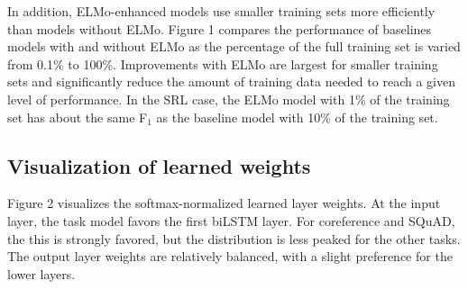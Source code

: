 \documentclass[11pt,a4paper]{article}
\newcommand{\ELMO}{ELMo}
\newcommand\mgcomment[1]{\textcolor{blue}{\textbf{[#1] --\textsc{MG}}}}
\begin{document}
In addition, \ELMO{}-enhanced models use smaller training sets more efficiently than models without \ELMO.
Figure 1 compares the performance of baselines models with and without \ELMO{} as the percentage of the full training set is varied from 0.1\% to 100\%.
Improvements with \ELMO{} are largest for smaller training sets and significantly reduce the amount of training data needed to reach a given level of performance.
In the SRL case, the \ELMO{} model with 1\% of the training set has about the same F$_1$ as the baseline model with 10\% of the training set.


\subsection{Visualization of learned weights}
\label{sec:visualize_weights}
Figure 2 visualizes the softmax-normalized learned layer weights. %
At the input layer, the task model favors the first biLSTM layer.
For coreference and SQuAD, the this is strongly favored, but the distribution is less peaked for the other tasks.
The output layer weights are relatively balanced, with a slight preference for the lower layers.


\end{document}
